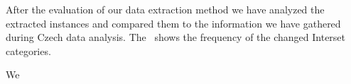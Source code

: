 After the evaluation of our data extraction method we have analyzed the extracted instances and compared them
to the information we have gathered during Czech data analysis. The~\Fref{} shows the frequency of the changed Interset
categories.

We

